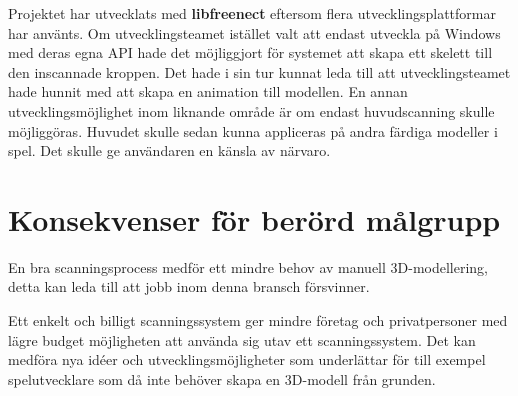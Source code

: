 \documentclass[a4paper,12pt,oneside,final]{extbook}
\begin{document}
Projektet har utvecklats med \textbf{libfreenect} eftersom flera utvecklingsplattformar har använts. Om utvecklingsteamet istället valt att endast utveckla på Windows med deras egna API hade det möjliggjort för systemet att skapa ett skelett till den inscannade kroppen. Det hade i sin tur kunnat leda till att utvecklingsteamet hade hunnit med att skapa en animation till modellen. En annan utvecklingsmöjlighet inom liknande område är om endast huvudscanning skulle möjliggöras. Huvudet skulle sedan kunna appliceras på andra färdiga modeller i spel. Det skulle ge användaren en känsla av närvaro.

\section{Konsekvenser för berörd målgrupp}
En bra scanningsprocess medför ett mindre behov av manuell 3D-modellering, detta kan leda till att jobb inom denna bransch försvinner.

Ett enkelt och billigt scanningssystem ger mindre företag och privatpersoner med lägre budget möjligheten att använda sig utav ett scanningssystem. Det kan medföra nya idéer och utvecklingsmöjligheter som underlättar för till exempel spelutvecklare som då inte behöver skapa en 3D-modell från grunden.
\end{document}
